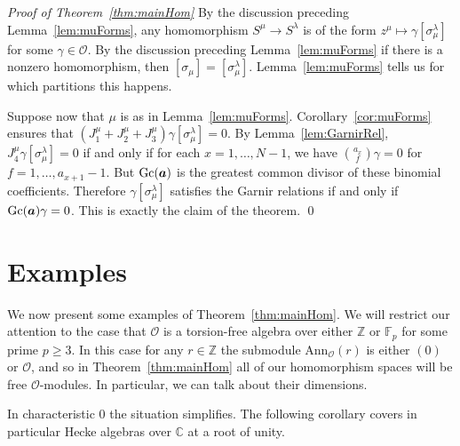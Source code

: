 \documentclass[twoside,11pt,reqno,letter]{amsart}
\numberwithin{equation}{section}
\theoremstyle{definition}  %
\def\ba{\text{\boldmath$a$}}
\newcommand{\Gc}{\operatorname{Gc}}
\newcommand{\F}{\mathbb{F}}
\newcommand{\Z}{\mathbb{Z}}
\newcommand{\0}{{\bar 0}}
\newcommand{\1}{{\bar 1}}
\newcommand{\ga}{\gamma}
\newcommand{\la}{\lambda}
\newcommand{\si}{\sigma}
\newcommand{\Ann}{{\mathrm {Ann}}}
\newcommand{\C}{{\mathbb C}}
\renewcommand\O{\mathcal O}
\begin{document}
{%

\emph{Proof of Theorem~\ref{thm:mainHom}}
  By the discussion preceding Lemma~\ref{lem:muForms}, any homomorphism $S^\mu \to S^\la$ is of the form $z^\mu \mapsto \ga [\si^\la_\mu]$ for some $\ga \in \O$. By the discussion preceding Lemma~\ref{lem:muForms} if there is a nonzero homomorphism, then $[\si_{\mu}] = [\si^\la_\mu]$. Lemma~\ref{lem:muForms} tells us for which partitions this happens. 

  Suppose now that $\mu$ is as in Lemma~\ref{lem:muForms}. Corollary~\ref{cor:muForms} ensures that $(J^\mu_1 + J^\mu_2 + J^\mu_3) \ga [\si^\la_\mu] = 0$. By Lemma~\ref{lem:GarnirRel}, $J^\mu_4 \ga [\si^\la_\mu] = 0$ if and only if for each $x = 1, \dots, N-1$, we have $\binom{a_x}{f} \ga = 0$ for $f = 1, \dots, a_{x+1} - 1$. But $\Gc(\ba)$ is the greatest common divisor of these binomial coefficients. Therefore $\ga [\si^\la_\mu]$ satisfies the Garnir relations if and only if $\Gc(\ba) \ga = 0$. This is exactly the claim of the theorem.
\qed





\section{Examples}

We now present some examples of Theorem~\ref{thm:mainHom}. We will restrict our attention to the case that $\O$ is a torsion-free algebra over either $\Z$ or $\F_p$ for some prime $p \geq 3$. In this case for any $r \in \Z$ the submodule $\Ann_\O(r)$ is either $(0)$ or $\O$, and so in Theorem~\ref{thm:mainHom} all of our homomorphism spaces will be free $\O$-modules. In particular, we can talk about their dimensions.

In characteristic $0$ the situation simplifies. The following corollary covers in particular Hecke algebras over $\C$ at a root of unity. %

}
\end{document}
